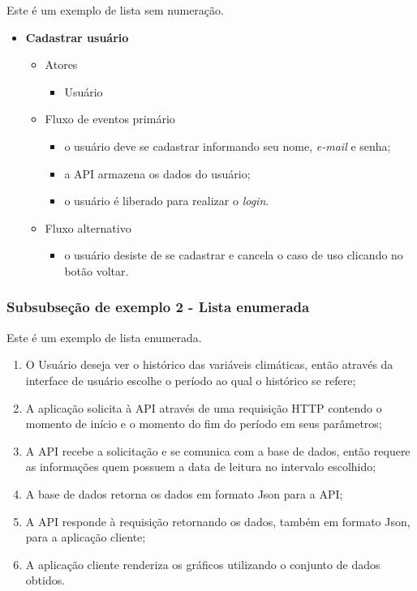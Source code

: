 Este é um exemplo de lista sem numeração.

\begin{itemize}
	\item \textbf{Cadastrar usuário}

		\begin{itemize}
    		\item Atores
		    	\begin{itemize}
    		    	\item Usuário
		    	\end{itemize}

	    	\item Fluxo de eventos primário
			    \begin{itemize}
	    		    \item o usuário deve se cadastrar informando seu nome, \textit{e-mail} e senha;
		        	\item a API armazena os dados do usuário;
		    	    \item o usuário é liberado para realizar o \textit{login}.
			    \end{itemize}

    		\item Fluxo alternativo
			    \begin{itemize}
		    	   \item o usuário desiste de se cadastrar e cancela o caso de uso clicando no botão voltar.
	    		\end{itemize}

		\end{itemize}
	
\end{itemize}

\subsubsection{Subsubseção de exemplo 2 - Lista enumerada} \label{subsubsec:enumerate}

Este é um exemplo de lista enumerada.

\begin{enumerate}
	\item O Usuário deseja ver o histórico das variáveis climáticas, então através da interface de usuário escolhe o período ao qual o histórico se refere;
	\item A aplicação solicita à API através de uma requisição HTTP contendo o momento de início e o momento do fim do período em seus parâmetros;     			\item A API recebe a solicitação e se comunica com a base de dados, então requere as informações quem possuem a data de leitura no intervalo escolhido;
	\item A base de dados retorna os dados em formato Json para a API;
	\item A API responde à requisição retornando os dados, também em formato Json, para a aplicação cliente;
	\item A aplicação cliente renderiza os gráficos utilizando o conjunto de dados obtidos.
\end{enumerate}

